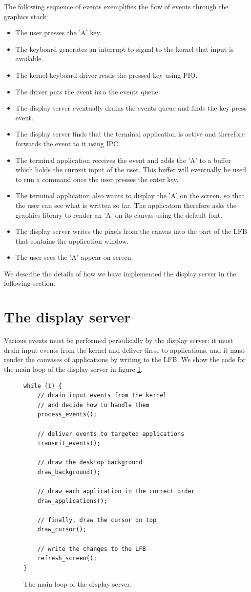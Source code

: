 \documentclass{report}
\begin{document}
The following sequence of events exemplifies the flow of events through the
graphics stack:
\begin{itemize}
\item The user presses the 'A' key.
\item The keyboard generates an interrupt to signal to the kernel that input
is available.
\item The kernel keyboard driver reads the pressed key using PIO.
\item The driver puts the event into the events queue.
\item The display server eventually drains the events queue and finds the key
press event.
\item The display server finds that the terminal application is active and
therefore forwards the event to it using IPC.
\item The terminal application receives the event and adds the 'A' to a buffer
which holds the current input of the user. This buffer will eventually be used
to run a command once the user presses the enter key.
\item The terminal application also wants to display the 'A' on the screen, so
that the user can see what is written so far. The application therefore asks
the graphics library to render an 'A' on its canvas using the default font.
\item The display server writes the pixels from the canvas into the part of the
LFB that contains the application window.
\item The user sees the 'A' appear on screen.
\end{itemize}
We describe the details of how we have implemented the display server in the
following section.


\section{The display server}
Various events must be performed periodically by the display server: it must
drain input events from the kernel and deliver these to applications, and it
must render the canvases of applications by writing to the LFB. We show the
code for the main loop of the display server in figure \ref{displayserver}.
\begin{figure}[h]
\begin{framed}
\begin{Verbatim}[fontsize=\small]
while (1) {
	// drain input events from the kernel 
	// and decide how to handle them
	process_events();

	// deliver events to targeted applications
	transmit_events();

	// draw the desktop background
	draw_background();

	// draw each application in the correct order
	draw_applications();

	// finally, draw the cursor on top
	draw_cursor();
	
	// write the changes to the LFB
	refresh_screen();
}
\end{Verbatim}
\end{framed}
\caption{The main loop of the display server.}
\label{displayserver}
\end{figure}
\end{document}
